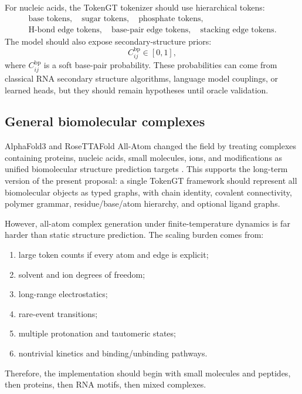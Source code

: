 \documentclass[11pt]{article}
\begin{document}
For nucleic acids, the TokenGT tokenizer should use hierarchical tokens:
\[
\begin{gathered}
\text{base tokens},\quad
\text{sugar tokens},\quad
\text{phosphate tokens},\\
\text{H-bond edge tokens},\quad
\text{base-pair edge tokens},\quad
\text{stacking edge tokens}.
\end{gathered}
\]
The model should also expose secondary-structure priors:
\[
C^{\mathrm{bp}}_{ij}\in[0,1],
\]
where $C^{\mathrm{bp}}_{ij}$ is a soft base-pair probability. These probabilities can come from classical RNA secondary structure algorithms, language model couplings, or learned heads, but they should remain hypotheses until oracle validation.

\subsection{General biomolecular complexes}

AlphaFold3 and RoseTTAFold All-Atom changed the field by treating complexes containing proteins, nucleic acids, small molecules, ions, and modifications as unified biomolecular structure prediction targets \cite{abramson2024af3,krishna2024rfaa}. This supports the long-term version of the present proposal: a single TokenGT framework should represent all biomolecular objects as typed graphs, with chain identity, covalent connectivity, polymer grammar, residue/base/atom hierarchy, and optional ligand graphs.

However, all-atom complex generation under finite-temperature dynamics is far harder than static structure prediction. The scaling burden comes from:
\begin{enumerate}[leftmargin=2em]
  \item large token counts if every atom and edge is explicit;
  \item solvent and ion degrees of freedom;
  \item long-range electrostatics;
  \item rare-event transitions;
  \item multiple protonation and tautomeric states;
  \item nontrivial kinetics and binding/unbinding pathways.
\end{enumerate}

Therefore, the implementation should begin with small molecules and peptides, then proteins, then RNA motifs, then mixed complexes.
\end{document}
